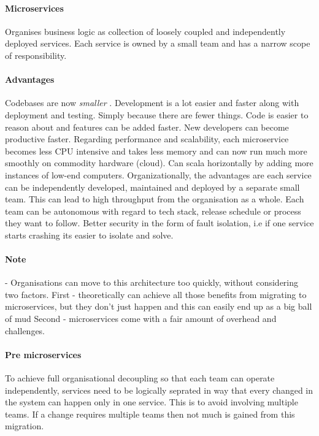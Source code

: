 \documentclass[a4paper, 11pt]{book}
\begin{document}
    \paragraph{Microservices}
    Organises business logic as collection of loosely coupled and independently deployed services.
    Each service is owned by a small team and has a narrow scope of responsibility.

    \paragraph{Advantages}
    Codebases are now \textit{smaller} .
    Development is a lot easier and faster along with deployment and testing.
    Simply because there are fewer things.
    Code is easier to reason about and features can be added faster.
    New developers can become productive faster.
    Regarding performance and scalability, each microservice becomes less CPU intensive and takes less memory and can now run much more smoothly on commodity hardware (cloud).
    Can scala horizontally by adding more instances of low-end computers.
    Organizationally, the advantages are each service can be independently developed, maintained and deployed by a separate small team.
    This can lead to high throughput from the organisation as a whole.
    Each team can be autonomous with regard to tech stack, release schedule or process they want to follow.
    Better security in the form of fault isolation, i.e if one service starts crashing its easier to isolate and solve.

    \paragraph{Note} - Organisations can move to this architecture too quickly, without considering two factors.
    First - theoretically can achieve all those benefits from migrating to microservices, but they don't just happen and this can easily end up as a big ball of mud
    Second - microservices come with a fair amount of overhead and challenges.

    \paragraph{Pre microservices}
    To achieve full organisational decoupling so that each team can operate independently, services need to be logically seprated in way that every changed in the system can happen only in one service.
    This is to avoid involving multiple teams.
    If a change requires multiple teams then not much is gained from this migration.
\end{document}
